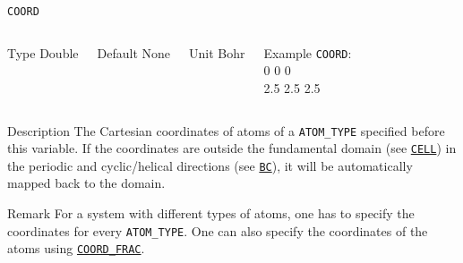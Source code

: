 \begin{frame}[allowframebreaks]{\texttt{{COORD}}} \label{COORD}
\vspace*{-12pt}
\begin{columns}
\begin{block}{Type}
Double
\end{block}

\begin{block}{Default}
None
\end{block}

\begin{block}{Unit}
Bohr
\end{block}

\begin{block}{Example}
\texttt{COORD}: \\
0 0 0 \\
2.5 2.5 2.5
\end{block}
\end{columns}

\begin{block}{Description}
The Cartesian coordinates of atoms of a \texttt{ATOM\_TYPE} specified before this variable. If the coordinates are outside the fundamental domain (see \hyperlink{CELL}{\texttt{CELL}}) in the periodic and cyclic/helical directions (see \hyperlink{BC}{\texttt{BC}}), it will be automatically mapped back to the domain.
\end{block}

\begin{block}{Remark}
For a system with different types of atoms, one has to specify the coordinates for every \texttt{ATOM\_TYPE}. One can also specify the coordinates of the atoms using \hyperlink{COORD_FRAC}{\texttt{COORD\_FRAC}}.
\end{block}
\end{frame}


